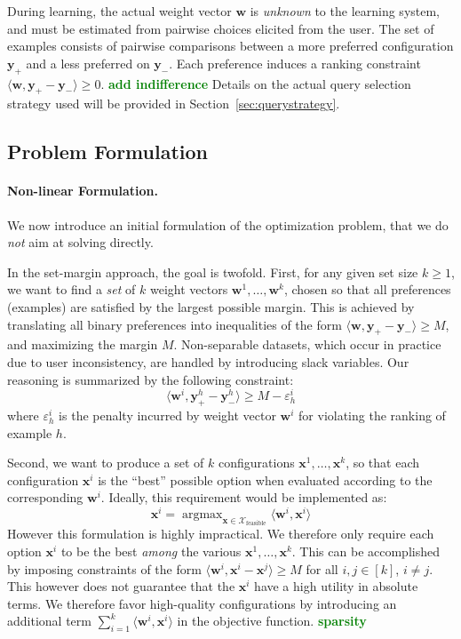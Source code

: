 \documentclass{article}
\renewcommand\[{\begin{equation}}
\renewcommand\]{\end{equation}}
\newcommand{\calvar}[1]{\ensuremath{\mathcal{#1}}}
\newcommand{\calX}{\calvar{X}}
\newcommand{\vecvar}[1]{\ensuremath{\boldsymbol{#1}}}
\newcommand{\vw}{\vecvar{w}}
\newcommand{\vx}{\vecvar{x}}
\newcommand{\vy}{\vecvar{y}}
\DeclareMathOperator*{\argmax}{argmax}
\newcommand{\stefano}[1]{{\bf \textcolor{green}{{\fbox{Stefano:} #1}}}}
\begin{document}
During learning, the actual weight vector $\vw$ is {\em unknown} to the
learning system, and must be estimated from pairwise choices elicited from the
user. The set of examples consists of pairwise comparisons between a more
preferred configuration $\vy_+$ and a less preferred on $\vy_-$. Each preference
induces a ranking constraint $\langle \vw, \vy_+ - \vy_- \rangle \ge 0$.
\stefano{add indifference}
Details on the actual query selection strategy used will be provided in
Section~\ref{sec:querystrategy}.

\subsection{Problem Formulation}

\paragraph{Non-linear Formulation.} We now introduce an initial formulation of
the optimization problem, that we do {\em not} aim at solving directly.

In the set-margin approach, the goal is twofold. First, for any given set size
$k\geq 1$, we want to find a {\em set} of $k$ weight vectors $\vw^{1},
\ldots, \vw^{k}$, chosen so that all preferences (examples) are satisfied by
the largest possible margin. This is achieved by translating all binary
preferences into inequalities of the form $\langle \vw, \vy_+ - \vy_- \rangle
\geq M$, and maximizing the margin $M$. Non-separable datasets, which occur in
practice due to user inconsistency, are handled by introducing slack variables.
Our reasoning is summarized by the following constraint:
%
$$ \langle \vw^{i}, \vy^{h}_+ - \vy^{h}_- \rangle \ge M - \varepsilon^{i}_h $$
%
where $\varepsilon^{i}_h$ is the penalty incurred by weight vector
$\vw^{i}$ for violating the ranking of example $h$.

Second, we want to produce a set of $k$ configurations $\vx^{1}, \ldots,
\vx^{k}$, so that each configuration $\vx^{i}$ is the ``best'' possible
option when evaluated according to the corresponding $\vw^{i}$. Ideally,
this requirement would be implemented as:
%
$$ \vx^{i} = \argmax_{\vx \in \calX_\text{feasible}} \langle \vw^{i}, \vx^{i} \rangle $$
%
However this formulation is highly impractical. We therefore only require 
each option $\vx^{i}$ to be the best {\em among} the various
$\vx^{1}, \ldots, \vx^{k}$. This can be accomplished by imposing
constraints of the form $\langle \vw^{i}, \vx^{i} - \vx^{j} \rangle \geq M$
for all $i,j\in[k]$, $i \ne j$.
This however does not guarantee that the $\vx^{i}$ have a high utility in
absolute terms. We therefore favor high-quality configurations by introducing
an additional term $\sum_{i=1}^k \langle \vw^{i}, \vx^{i} \rangle$ in the
objective function. \stefano{sparsity}
\end{document}
